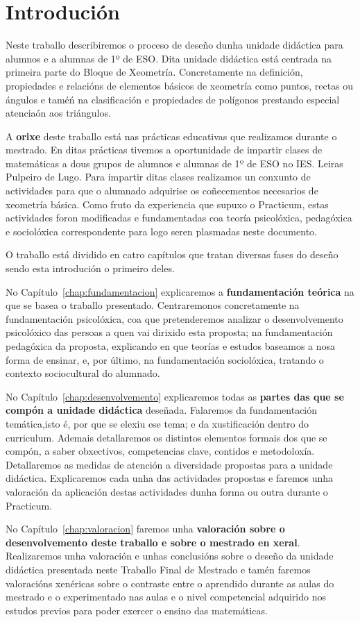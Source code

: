 %

\chapter[Introdución]{Introdución}
Neste traballo describiremos o proceso de deseño dunha unidade didáctica para alumnos e a alumnas de 1º de ESO. Dita unidade didáctica está centrada na primeira parte do Bloque de Xeometría. Concretamente na definición, propiedades e relacións de elementos básicos de xeometría como puntos, rectas ou ángulos e taméń na clasificación e propiedades de polígonos prestando especial atenciaón aos triángulos.

A \textbf{orixe} deste traballo está nas prácticas educativas que realizamos durante o mestrado. En ditas prácticas tivemos a oportunidade de impartir clases de matemáticas a dous grupos de alumnos e alumnas de 1º de ESO no IES. Leiras Pulpeiro de Lugo. Para impartir ditas clases realizamos un conxunto de actividades para que o alumnado adquirise os coñecementos necesarios de xeometría básica. Como fruto da experiencia que supuxo o Practicum, estas actividades foron modificadas e fundamentadas coa teoría psicolóxica, pedagóxica e sociolóxica correspondente para logo seren plasmadas neste documento.

O traballo está dividido en catro capítulos que tratan diversas fases do deseño sendo esta introdución o primeiro deles.

No Capítulo~\ref{chap:fundamentacion} explicaremos a \textbf{fundamentación teórica} na que se basea o traballo presentado. Centraremonos concretamente na fundamentación psicolóxica, coa que pretenderemos analizar o desenvolvemento psicolóxico das persoas a quen vai dirixido esta proposta; na fundamentación pedagóxica da proposta, explicando en que teorías e estudos baseamos a nosa forma de ensinar, e, por último, na fundamentación sociolóxica, tratando o contexto sociocultural do alumnado.

No Capítulo~\ref{chap:desenvolvemento} explicaremos todas as \textbf{partes das que se compón a unidade didáctica} deseñada. Falaremos da fundamentación temática,isto é, por que se elexiu ese tema; e da xustificación dentro do curriculum. Ademais detallaremos os distintos elementos formais dos que se compón, a saber obxectivos, competencias clave, contidos e metodoloxía. Detallaremos as medidas de atención a diversidade propostas para a unidade didáctica. Explicaremos cada unha das actividades propostas e faremos unha valoración da aplicación destas actividades dunha forma ou outra durante o Practicum.

No Capítulo~\ref{chap:valoracion} faremos unha \textbf{valoración sobre o desenvolvemento deste traballo e sobre o mestrado en xeral}. Realizaremos unha valoración e unhas conclusións sobre o deseño da unidade didáctica presentada neste Traballo Final de Mestrado e tamén faremos valoracións xenéricas sobre o contraste entre o aprendido durante as aulas do mestrado e o experimentado nas aulas e o nivel competencial adquirido nos estudos previos para poder exercer o ensino das matemáticas.
